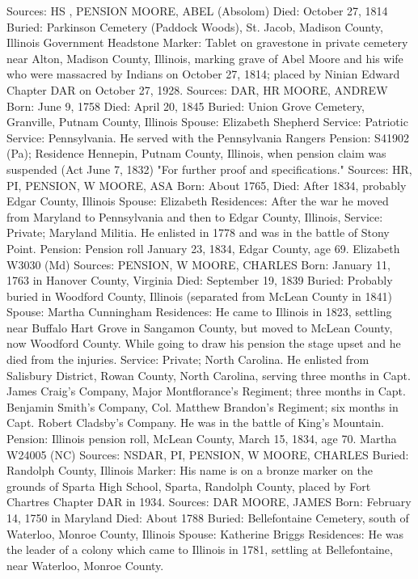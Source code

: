 Sources: HS , PENSION 
MOORE, ABEL (Absolom) 
Died: October 27, 1814 
Buried: Parkinson Cemetery (Paddock Woods), St. Jacob, Madison County, Illinois Government Headstone 
Marker: Tablet on gravestone in private cemetery near Alton, Madison County, Illinois, marking grave of Abel Moore and his wife who were massacred by Indians on October 27, 1814; placed by Ninian Edward Chapter DAR on October 27, 1928. 
Sources: DAR, HR 
MOORE, ANDREW
Born: June 9, 1758
Died: April 20, 1845 
Buried: Union Grove Cemetery, Granville, Putnam County, Illinois
Spouse: Elizabeth Shepherd
Service: Patriotic
Service: Pennsylvania. He served with the Pennsylvania Rangers 
Pension: S41902 (Pa); Residence Hennepin, Putnam County, Illinois, when pen­sion claim was suspended (Act June 7, 1832) "For further proof and specifi­cations." 
Sources: HR, PI, PENSION, W 
MOORE, ASA 
Born: About 1765,
Died: After 1834, probably Edgar County, Illinois
Spouse: Elizabeth 
Residences: After the war he moved from Maryland to Pennsylvania and then to Edgar County, Illinois, 
Service: Private; Maryland Militia. He enlisted in 1778 and was in the battle of Stony Point. 
Pension: Pension roll January 23, 1834, Edgar County, age 69. Elizabeth W3030 (Md) 
Sources: PENSION, W 
MOORE, CHARLES 
Born: January 11, 1763 in Hanover County, Virginia
Died: September 19, 1839
Buried: Probably buried in Woodford County, Illinois (separated from McLean 
County in 1841) 
Spouse: Martha Cunningham 
Residences: He came to Illinois in 1823, settling near Buffalo Hart Grove in Sangamon County, but moved to McLean County, now Woodford County. While going to draw his pension the stage upset and he died from the injuries. 
Service: Private; North Carolina. He enlisted from Salisbury District, Rowan County, North Carolina, serving three months in Capt. James Craig's Com­pany, Major Montflorance's Regiment; three months in Capt. Benjamin Smith's Company, Col. Matthew Brandon's Regiment; six months in Capt. Robert Cladsby's Company. He was in the battle of King's Mountain. 
Pension: Illinois pension roll, McLean County, March 15, 1834, age 70. Martha W24005 (NC) 
Sources: NSDAR, PI, PENSION, W 
MOORE, CHARLES
Buried:  Randolph County, Illinois
Marker: His name is on a bronze marker on the grounds of Sparta High School, Sparta, Randolph County, placed by Fort Chartres Chapter DAR in 1934.
Sources: DAR 
MOORE, JAMES 
Born: February 14, 1750 in Maryland
Died: About 1788
Buried: Bellefontaine Cemetery, south of Waterloo, Monroe County, Illinois
Spouse: Katherine Briggs
Residences: He was the leader of a colony which came to Illinois in 1781, settling at Bellefontaine, near Waterloo, Monroe County.

